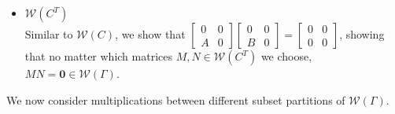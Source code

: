 \documentclass{article}
\begin{document}
\begin{itemize}
    \item $\mathcal{W}(C^T)$ \\
    Similar to $\mathcal{W}(C)$, we show that $\begin{bmatrix}
        0 & 0 \\ A & 0
    \end{bmatrix}\begin{bmatrix}
        0&0\\B&0
    \end{bmatrix} = \begin{bmatrix}
        0&0\\0&0
    \end{bmatrix}$, showing that no matter which matrices $M,N \in \mathcal{W}(C^T)$ we choose, $MN=\mathbf{0} \in \mathcal{W}(\Gamma)$.
\end{itemize}

We now consider multiplications between different subset partitions of $\mathcal{W}(\Gamma)$.
\end{document}
